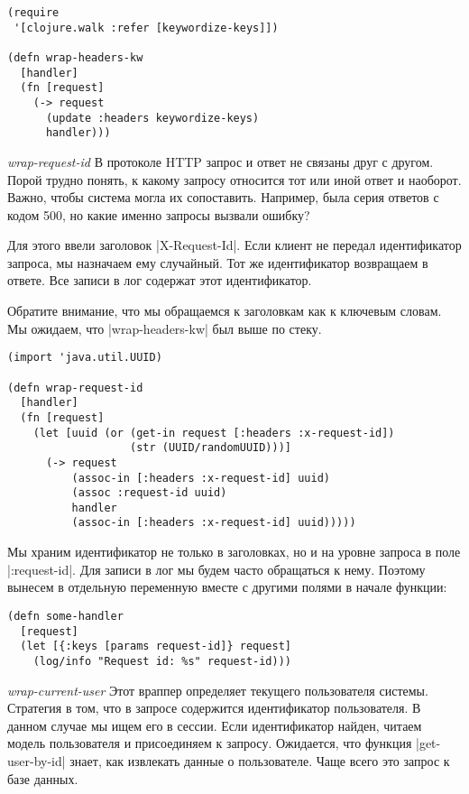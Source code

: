 \begin{verbatim}
(require
 '[clojure.walk :refer [keywordize-keys]])

(defn wrap-headers-kw
  [handler]
  (fn [request]
    (-> request
      (update :headers keywordize-keys)
      handler)))
\end{verbatim}



\emph{wrap-request-id} В протоколе HTTP запрос и ответ не связаны друг с
другом. Порой трудно понять, к какому запросу относится тот или иной ответ и
наоборот. Важно, чтобы система могла их сопоставить. Например, была серия
ответов с кодом 500, но какие именно запросы вызвали ошибку?

Для этого ввели заголовок \spverb|X-Request-Id|. Если клиент не передал идентификатор
запроса, мы назначаем ему случайный. Тот же идентификатор возвращаем в
ответе. Все записи в лог содержат этот идентификатор.

Обратите внимание, что мы обращаемся к заголовкам как к ключевым словам. Мы
ожидаем, что \spverb|wrap-headers-kw| был выше по стеку.

\begin{verbatim}
(import 'java.util.UUID)

(defn wrap-request-id
  [handler]
  (fn [request]
    (let [uuid (or (get-in request [:headers :x-request-id])
                   (str (UUID/randomUUID)))]
      (-> request
          (assoc-in [:headers :x-request-id] uuid)
          (assoc :request-id uuid)
          handler
          (assoc-in [:headers :x-request-id] uuid)))))
\end{verbatim}

Мы храним идентификатор не только в заголовках, но и на уровне запроса в поле
\spverb|:request-id|. Для записи в лог мы будем часто обращаться к нему. Поэтому
вынесем в отдельную переменную вместе с другими полями в начале функции:

\begin{verbatim}
(defn some-handler
  [request]
  (let [{:keys [params request-id]} request]
    (log/info "Request id: %s" request-id)))
\end{verbatim}

\emph{wrap-current-user} Этот враппер определяет текущего пользователя
системы. Стратегия в том, что в запросе содержится идентификатор пользователя. В
данном случае мы ищем его в сессии. Если идентификатор найден, читаем модель
пользователя и присоединяем к запросу. Ожидается, что функция
\spverb|get-user-by-id| знает, как извлекать данные о пользователе. Чаще всего
это запрос к базе данных.


